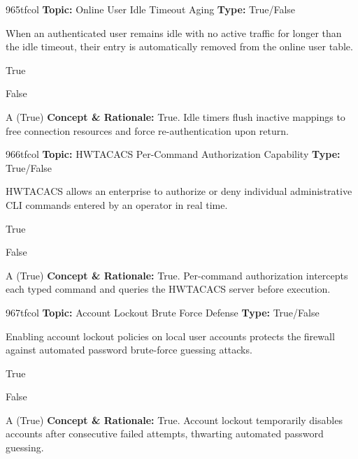\begin{qcard}{965}{tfcol}
\textcolor{darkslate!75}{\small\textbf{Topic:} Online User Idle Timeout Aging \hfill \textbf{Type:} True/False}\vspace{0.4em}\par
When an authenticated user remains idle with no active traffic for longer than the idle timeout, their entry is automatically removed from the online user table.
\begin{qoptions}
\item True
\item False
\end{qoptions}
\end{qcard}
\nopagebreak
\begin{explainbox}{A (True)}
\textbf{Concept \& Rationale:} True. Idle timers flush inactive mappings to free connection resources and force re-authentication upon return.
\end{explainbox}

\begin{qcard}{966}{tfcol}
\textcolor{darkslate!75}{\small\textbf{Topic:} HWTACACS Per-Command Authorization Capability \hfill \textbf{Type:} True/False}\vspace{0.4em}\par
HWTACACS allows an enterprise to authorize or deny individual administrative CLI commands entered by an operator in real time.
\begin{qoptions}
\item True
\item False
\end{qoptions}
\end{qcard}
\nopagebreak
\begin{explainbox}{A (True)}
\textbf{Concept \& Rationale:} True. Per-command authorization intercepts each typed command and queries the HWTACACS server before execution.
\end{explainbox}

\begin{qcard}{967}{tfcol}
\textcolor{darkslate!75}{\small\textbf{Topic:} Account Lockout Brute Force Defense \hfill \textbf{Type:} True/False}\vspace{0.4em}\par
Enabling account lockout policies on local user accounts protects the firewall against automated password brute-force guessing attacks.
\begin{qoptions}
\item True
\item False
\end{qoptions}
\end{qcard}
\nopagebreak
\begin{explainbox}{A (True)}
\textbf{Concept \& Rationale:} True. Account lockout temporarily disables accounts after consecutive failed attempts, thwarting automated password guessing.
\end{explainbox}

